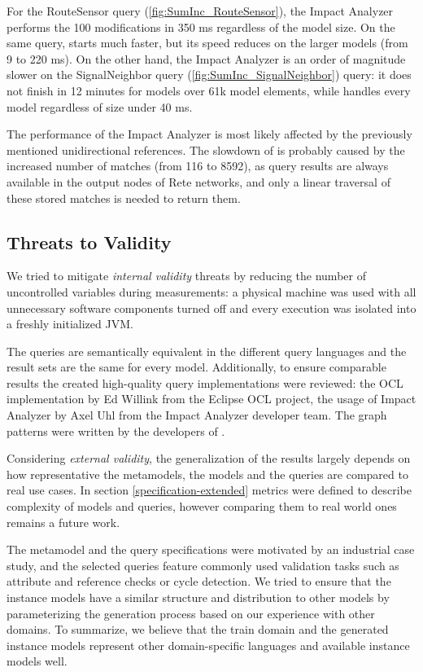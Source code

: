 For the \textsf{RouteSensor} query (\autoref{fig:SumInc_RouteSensor}), the Impact
Analyzer performs the 100 modifications in 350 ms regardless of the model
size. On the same query, \incquery{} starts much faster, but its speed reduces
on the larger models (from 9 to 220 ms). On the other hand, the Impact
Analyzer is an order of magnitude slower on the \textsf{SignalNeighbor} query
(\autoref{fig:SumInc_SignalNeighbor}) query: it does not finish in 12 minutes
for models over 61k model elements, while \incquery{} handles every model
regardless of size under 40 ms.

The performance of the Impact Analyzer is most likely affected by the previously
mentioned unidirectional references. The slowdown of \incquery{} is probably
caused by the increased number of matches (from 116 to 8592), as query
results are always available in the output nodes of Rete networks, and only a
linear traversal of these stored matches is needed to return them.

\subsection{Threats to Validity}
We tried to mitigate \emph{internal validity} threats by reducing the number of
uncontrolled variables during measurements: a physical machine was used with all
unnecessary software components turned off and every execution was isolated into
a freshly initialized JVM.

The queries are semantically equivalent in the different query languages and the
result sets are the same for every model. Additionally, to ensure comparable
results the created high-quality query implementations were reviewed: the OCL
implementation by Ed Willink from the Eclipse OCL project, the usage of Impact
Analyzer by Axel Uhl from the Impact Analyzer developer team. The graph patterns
were written by the developers of \incquery{}.

Considering \emph{external validity}, the generalization of the results largely
depends on how representative the metamodels, the models and the queries are
compared to real use cases. In section \ref{specification-extended} metrics were
defined to describe complexity of models and queries, however comparing them to
real world ones remains a future work.

The metamodel and the query specifications were motivated by an industrial case
study, and the selected queries feature commonly used validation tasks such as
attribute and reference checks or cycle detection. We tried to ensure that the
instance models have a similar structure and distribution to other models by
parameterizing the generation process based on our experience with other
domains. To summarize, we believe that the train domain and the generated
instance models represent other domain-specific languages and available instance
models well.

